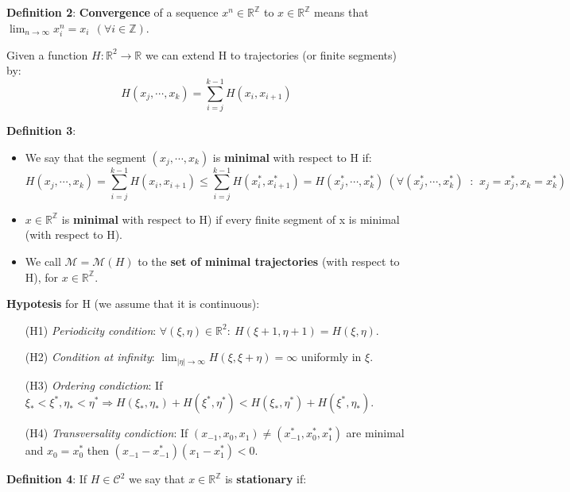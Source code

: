 \documentclass{article}
\begin{document}
\noindent \textbf{Definition 2}: \textbf{Convergence} of a sequence $x^n \in \mathbb{R}^{\mathbb{Z}}$ to $x \in \mathbb{R}^{\mathbb{Z}}$ means that $\lim_{n \rightarrow \infty } x_{i}^{n} = x_{i} \ \ (\forall i \in \mathbb{Z})$.
		
\noindent Given a function $H: \mathbb{R}^2 \rightarrow \mathbb{R}$ we can extend H to trajectories (or finite segments) by:
	$$
		H (x_j, \cdots, x_k) = \sum_{i = j}^{k - 1} H ( x_i, x_{i + 1} ) 
	$$
	
\noindent \textbf{Definition 3}:
\begin{itemize}
	\item We say that the segment $(x_j, \cdots, x_k)$ is \textbf{minimal} with respect to H if:
	$$
		H ( x_j, \cdots, x_k) = \sum_{i = j}^{k - 1} H ( x_i, x_{i + 1} )  \leq \sum_{i = j}^{k - 1} H ( x_{i}^{*}, x_{i + 1}^{*} ) = H (x_{j}^{*}, \cdots, x_{k}^{*}) \  (   \forall (x_{j}^{*}, \cdots, x_{k}^{*})  \ \text{ : } \ x_j =  x_{j}^{*}, x_k = x_{k}^{*}   )
	$$
	
	\item $x \in \mathbb{R}^{\mathbb{Z}}$ is \textbf{minimal} with respect to H) if every finite segment of x is minimal (with respect to H).
	
	\item We call $\mathcal{M} = \mathcal{M}(H)$ to the \textbf{set of minimal trajectories} (with respect to H), for $x \in \mathbb{R}^{\mathbb{Z}}$.
\end{itemize}
 
\noindent \textbf{Hypotesis} for H (we assume that it is continuous):
\begin{itemize}
	\item[(H1)] \textit{Periodicity condition}: $ \forall (\xi, \eta) \in \mathbb{R}^{2}: \ H( \xi + 1, \eta + 1) = H(\xi, \eta)$.
	\item[(H2)] \textit{Condition at infinity}: $\lim_{|\eta | \rightarrow \infty } H (\xi, \xi + \eta) = \infty$ uniformly in $\xi$.
	\item[(H3)] \textit{Ordering condiction}: If $\xi_{*} < \xi^{*}, \eta_{*} < \eta^{*} \Rightarrow H( \xi_{*}, \eta_{*}) + H( \xi^{*}, \eta^{*}) < H( \xi_{*}, \eta^{*}) + H( \xi^{*}, \eta_{*})$.
	\item[(H4)] \textit{Transversality condiction}: If $(x_{-1}, x_{0}, x_{1}) \neq (x_{-1}^{*}, x_{0}^{*}, x_{1}^{*})$ are minimal and $x_0 = x_{0}^{*}$ then $(x_{-1} - x_{-1}^{*})(x_{1} - x_{1}^{*}) < 0$.
\end{itemize}  

\noindent \textbf{Definition 4}: If $H \in \mathcal{C}^{2}$ we say that $x \in \mathbb{R}^{\mathbb{Z}}$ is \textbf{stationary} if:
\end{document}

